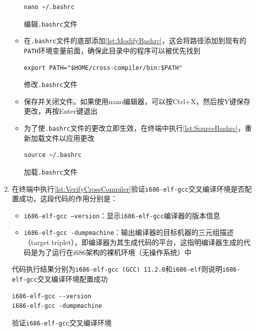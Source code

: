 \begin{enumerate}
\begin{itemize}
\begin{listing}[htbp]
\begin{verbatim}
nano ~/.bashrc
                    \end{verbatim}
                        \caption{编辑\texttt{.bashrc}文件}\label{lst:EditBashrc}
                    \end{listing}
              \item 在\texttt{.bashrc}文件的底部添加\cref{lst:ModifyBashrc}，这会将路径添加到现有的\texttt{PATH}环境变量前面，确保此目录中的程序可以被优先找到
                    \begin{listing}[htbp]
                        \begin{verbatim}
export PATH="$HOME/cross-compiler/bin:$PATH"
                    \end{verbatim}
                        \caption{修改\texttt{.bashrc}文件}\label{lst:ModifyBashrc}
                    \end{listing}
              \item 保存并关闭文件。如果使用nano编辑器，可以按Ctrl+X，然后按Y键保存更改，再按Enter键退出
              \item 为了使\texttt{.bashrc}文件的更改立即生效，在终端中执行\cref{lst:SourceBashrc}，重新加载文件以应用更改
                    \begin{listing}[htbp]
                        \begin{verbatim}
source ~/.bashrc
                    \end{verbatim}
                        \caption{加载\texttt{.bashrc}文件}\label{lst:SourceBashrc}
                    \end{listing}
          \end{itemize}
    \item 在终端中执行\cref{lst:VerifyCrossCompiler}验证\texttt{i686-elf-gcc}交叉编译环境是否配置成功，这段代码的作用分别是：
          \begin{itemize}
              \item \texttt{i686-elf-gcc --version}：显示\texttt{i686-elf-gcc}编译器的版本信息
              \item \texttt{i686-elf-gcc -dumpmachine}：输出编译器的目标机器的三元组描述（target triplet），即编译器为其生成代码的平台，这指明编译器生成的代码是为了运行在i686架构的裸机环境（无操作系统）中
          \end{itemize}
          代码执行结果分别为\texttt{i686-elf-gcc (GCC) 11.2.0}和\texttt{i686-elf}则说明\texttt{i686-elf-gcc}交叉编译环境配置成功
          \begin{listing}[htbp]
              \begin{verbatim}
i686-elf-gcc --version
i686-elf-gcc -dumpmachine
          \end{verbatim}
              \caption{验证\texttt{i686-elf-gcc}交叉编译环境}\label{lst:VerifyCrossCompiler}
          \end{listing}
\end{enumerate}

